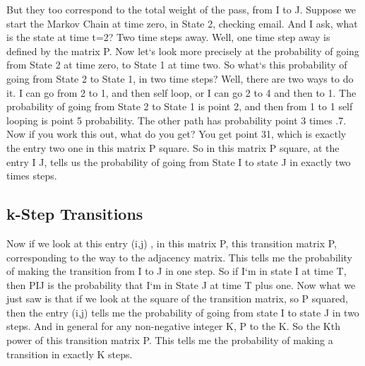 But they too correspond to the total weight of the pass, from I to J\@.
Suppose we start the Markov Chain at time zero, in State 2, checking email.
And I ask, what is the state at time t=2? Two time steps away.
Well, one time step away is defined by the matrix P\@.
Now let`s look more precisely at the probability of going from State 2 at time zero, to State 1 at time two.
So what`s this probability of going from State 2 to State 1, in two time steps? Well, there are two ways to do it.
I can go from 2 to 1, and then self loop, or I can go 2 to 4 and then to 1.
The probability of going from State 2 to State 1 is point 2, and then from 1 to 1 self looping is point 5 probability.
The other path has probability point 3 times .7.
Now if you work this out, what do you get? You get point 31, which is exactly the entry two one in this matrix P square.
So in this matrix P square, at the entry I J, tells us the probability of going from State I to state J in exactly two times steps.

\subsection{k-Step Transitions}
Now if we look at this entry (i,j) , in this matrix P, this transition matrix P, corresponding to the way to the adjacency matrix.
This tells me the probability of making the transition from I to J in one step.
So if I`m in state I at time T, then PIJ is the probability that I`m in State J at time T plus one.
Now what we just saw is that if we look at the square of the transition matrix, so P squared, then the entry (i,j) tells me the probability of going from state I to state J in two steps.
And in general for any non-negative integer K, P to the K\@.
So the Kth power of this transition matrix P\@.
This tells me the probability of making a transition in exactly K steps.

